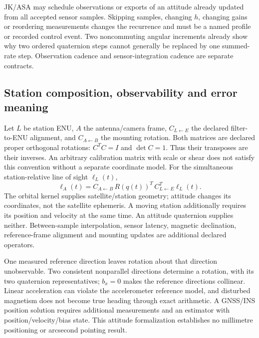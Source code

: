 JK/ASA may schedule observations or exports of an attitude already updated from
all accepted sensor samples. Skipping samples, changing $h$, changing gains or
reordering measurements changes the recurrence and must be a named profile or
recorded control event. Two noncommuting angular increments already show why
two ordered quaternion steps cannot generally be replaced by one summed-rate
step. Observation cadence and sensor-integration cadence are separate contracts.

\subsection{Station composition, observability and error meaning}
Let $L$ be station ENU, $A$ the antenna/camera frame, $C_{L\leftarrow E}$ the
declared filter-to-ENU alignment, and $C_{A\leftarrow B}$ the mounting rotation.
Both matrices are declared proper orthogonal rotations: $C^TC=I$ and
$\det C=1$. Thus their transposes are their inverses. An arbitrary calibration
matrix with scale or shear does not satisfy this convention without a separate
coordinate model.
For the simultaneous station-relative line of sight $\ell_L(t)$,
\[
\ell_A(t)=C_{A\leftarrow B}\,R(q(t))^T\,
 C_{L\leftarrow E}^T\ell_L(t).
\]
The orbital kernel supplies satellite/station geometry; attitude changes its
coordinates, not the satellite ephemeris. A moving station additionally requires
its position and velocity at the same time. An attitude quaternion supplies
neither. Between-sample interpolation, sensor latency, magnetic declination,
reference-frame alignment and mounting updates are additional declared operators.

One measured reference direction leaves rotation about that direction
unobservable. Two consistent nonparallel directions determine a rotation,
with its two quaternion representatives; $b_x=0$ makes the reference directions
collinear. Linear acceleration can violate the accelerometer reference model,
and disturbed magnetism does not become true heading through exact arithmetic.
A GNSS/INS position solution requires additional measurements and an estimator
with position/velocity/bias state. This attitude formalization establishes no
millimetre positioning or arcsecond pointing result.

